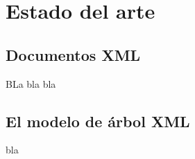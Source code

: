 
\chapter{Estado del arte}
\label{cap:estado_del_arte}


\section{Documentos XML}
 
BLa bla bla

\section{El modelo de árbol XML}

bla
